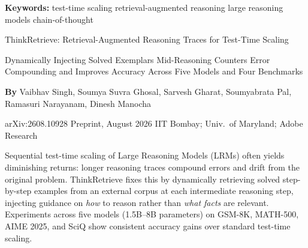\documentclass[10pt,twocolumn]{article}
\begin{document}
\setlength{\parindent}{0pt}
\setlength{\parskip}{4pt}

{\small\color{keywordgray}\textbf{Keywords:}
  test-time scaling \textbullet{}
  retrieval-augmented reasoning \textbullet{}
  large reasoning models \textbullet{}
  chain-of-thought}\par\vspace{4pt}

{\LARGE\bfseries\raggedright
  ThinkRetrieve: Retrieval-Augmented Reasoning
  Traces for Test-Time Scaling}\par\vspace{4pt}

{\large\itshape\raggedright
  Dynamically Injecting Solved Exemplars Mid-Reasoning Counters Error Compounding
  and Improves Accuracy Across Five Models and Four Benchmarks}\par\vspace{6pt}

{\small\textbf{By} Vaibhav Singh, Soumya Suvra Ghosal, Sarvesh Gharat,
  Soumyabrata Pal, Ramasuri Narayanam, Dinesh Manocha}\par\vspace{2pt}

{\small\color{keywordgray}arXiv:2608.10928 \textbullet{} Preprint, August 2026 \textbullet{}
  IIT Bombay; Univ.\ of Maryland; Adobe Research}
\par\vspace{2pt}\noindent{\color{rulered}\rule{\columnwidth}{0.6pt}}\vspace{6pt}

Sequential test-time scaling of Large Reasoning Models (LRMs) often yields
diminishing returns: longer reasoning traces compound errors and drift from
the original problem. ThinkRetrieve fixes this by dynamically retrieving
solved step-by-step examples from an external corpus at each intermediate reasoning
step, injecting guidance on \emph{how} to reason rather than \emph{what facts}
are relevant. Experiments across five models (1.5B--8B parameters) on GSM-8K,
MATH-500, AIME 2025, and SciQ show consistent accuracy gains over standard
test-time scaling.
\end{document}
